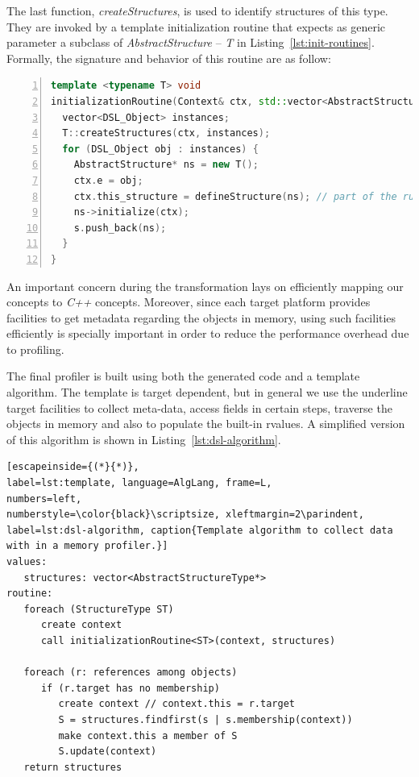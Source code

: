 The last function, \textit{createStructures}, is used to identify structures of this type.
They are invoked by a template initialization routine that expects as generic parameter a subclass of 
\textit{AbstractStructure} -- \textit{T} in Listing~\ref{lst:init-routines}.
Formally, the signature and behavior of this routine are as follow:
\begin{lstlisting}[language=C++, frame=L,
numbers=left,
numberstyle=\color{black}\scriptsize,xleftmargin=2\parindent,
label=lst:init-routines, caption={Routine to initialize structures in the heap.}]
template <typename T> void
initializationRoutine(Context& ctx, std::vector<AbstractStructure*>& s){
  vector<DSL_Object> instances;
  T::createStructures(ctx, instances);
  for (DSL_Object obj : instances) {
    AbstractStructure* ns = new T();
    ctx.e = obj;
    ctx.this_structure = defineStructure(ns); // part of the runtime support
    ns->initialize(ctx);
    s.push_back(ns);
  }
}
\end{lstlisting}
An important concern during the transformation lays on efficiently mapping our concepts to \textit{C++} concepts.
Moreover, since each target platform provides facilities to get metadata regarding the objects in memory, using such facilities efficiently is specially important in order to reduce the performance overhead due to profiling.

The final profiler is built using both the generated code and a template algorithm.
The template is target dependent, but in general we use the underline target facilities to collect meta-data, access fields in certain steps, traverse the objects in memory and also to populate the built-in rvalues.
A simplified version of this algorithm is shown in Listing~\ref{lst:dsl-algorithm}.

\begin{lstlisting}[escapeinside={(*}{*)},
label=lst:template, language=AlgLang, frame=L,
numbers=left,
numberstyle=\color{black}\scriptsize, xleftmargin=2\parindent,
label=lst:dsl-algorithm, caption{Template algorithm to collect data with in a memory profiler.}]
values:
   structures: vector<AbstractStructureType*>
routine:
   foreach (StructureType ST)
	  create context
	  call initializationRoutine<ST>(context, structures)
   
   foreach (r: references among objects)
      if (r.target has no membership)
         create context // context.this = r.target
         S = structures.findfirst(s | s.membership(context))
         make context.this a member of S
         S.update(context)
   return structures 
\end{lstlisting}

